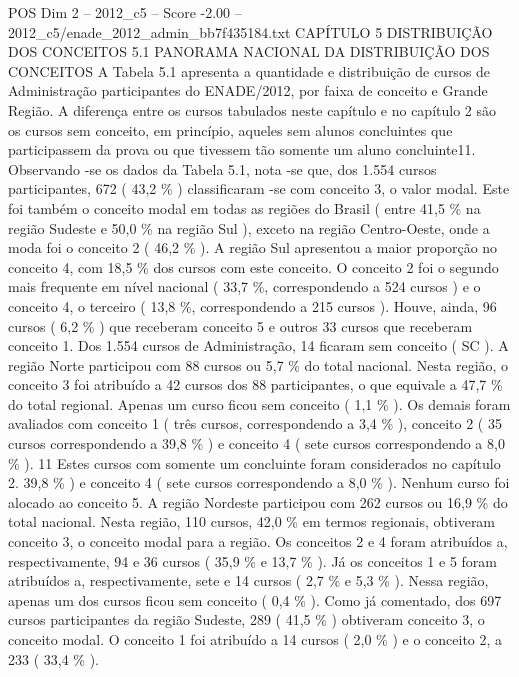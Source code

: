 \begin{textsample}{POS Dim 2 – 2012\_c5 – Score -2.00 – 2012\_c5/enade\_2012\_admin\_bb7f435184.txt}  \label{ex:f2_pos_364}
CAPÍTULO 5 DISTRIBUIÇÃO DOS CONCEITOS 5.1 PANORAMA NACIONAL DA DISTRIBUIÇÃO DOS CONCEITOS A Tabela 5.1 apresenta a quantidade e distribuição de cursos de Administração participantes do ENADE/2012, por faixa de conceito e Grande Região.
A diferença entre os cursos tabulados neste capítulo e no capítulo 2 são os cursos sem conceito, em princípio, aqueles sem alunos concluintes que participassem da prova ou que tivessem tão somente um aluno concluinte11.
Observando -se os dados da Tabela 5.1, nota -se que, dos 1.554 cursos participantes, 672 ( 43,2 \% ) classificaram -se com conceito 3, o valor modal.
Este foi também o conceito modal em todas as regiões do Brasil ( entre 41,5 \% na região Sudeste e 50,0 \% na região Sul ), exceto na região Centro-Oeste, onde a moda foi o conceito 2 ( 46,2 \% ).
A região Sul apresentou a maior proporção no conceito 4, com 18,5 \% dos cursos com este conceito.
O conceito 2 foi o segundo mais frequente em nível nacional ( 33,7 \%, correspondendo a 524 cursos ) e o conceito 4, o terceiro ( 13,8 \%, correspondendo a 215 cursos ).
Houve, ainda, 96 cursos ( 6,2 \% ) que receberam conceito 5 e outros 33 cursos que receberam conceito 1.
Dos 1.554 cursos de Administração, 14 ficaram sem conceito ( SC ).
A região Norte participou com 88 cursos ou 5,7 \% do total nacional.
Nesta região, o conceito 3 foi atribuído a 42 cursos dos 88 participantes, o que equivale a 47,7 \% do total regional.
Apenas um curso ficou sem conceito ( 1,1 \% ).
Os demais foram avaliados com conceito 1 ( três cursos, correspondendo a 3,4 \% ), conceito 2 ( 35 cursos correspondendo a 39,8 \% ) e conceito 4 ( sete cursos correspondendo a 8,0 \% ). 11 Estes cursos com somente um concluinte foram considerados no capítulo 2. 39,8 \% ) e conceito 4 ( sete cursos correspondendo a 8,0 \% ).
Nenhum curso foi alocado ao conceito 5.
A região Nordeste participou com 262 cursos ou 16,9 \% do total nacional.
Nesta região, 110 cursos, 42,0 \% em termos regionais, obtiveram conceito 3, o conceito modal para a região.
Os conceitos 2 e 4 foram atribuídos a, respectivamente, 94 e 36 cursos ( 35,9 \% e 13,7 \% ).
Já os conceitos 1 e 5 foram atribuídos a, respectivamente, sete e 14 cursos ( 2,7 \% e 5,3 \% ).
Nessa região, apenas um dos cursos ficou sem conceito ( 0,4 \% ).
Como já comentado, dos 697 cursos participantes da região Sudeste, 289 ( 41,5 \% ) obtiveram conceito 3, o conceito modal.
O conceito 1 foi atribuído a 14 cursos ( 2,0 \% ) e o conceito 2, a 233 ( 33,4 \% ).

\end{textsample}
